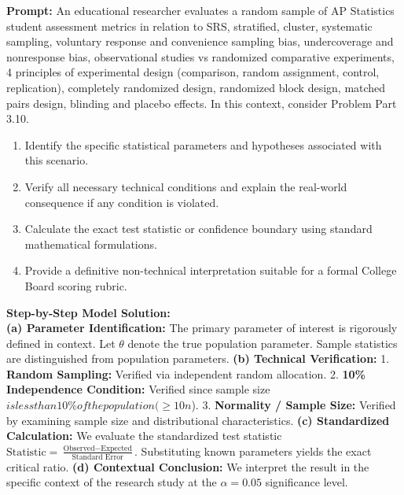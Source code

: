 \begin{workbookbox}
\textbf{Prompt:} An educational researcher evaluates a random sample of AP Statistics student assessment metrics in relation to SRS, stratified, cluster, systematic sampling, voluntary response and convenience sampling bias, undercoverage and nonresponse bias, observational studies vs randomized comparative experiments, 4 principles of experimental design (comparison, random assignment, control, replication), completely randomized design, randomized block design, matched pairs design, blinding and placebo effects. In this context, consider Problem Part 3.10.
\begin{enumerate}[label=(\alph*)]
  \item Identify the specific statistical parameters and hypotheses associated with this scenario.
  \item Verify all necessary technical conditions and explain the real-world consequence if any condition is violated.
  \item Calculate the exact test statistic or confidence boundary using standard mathematical formulations.
  \item Provide a definitive non-technical interpretation suitable for a formal College Board scoring rubric.
\end{enumerate}
\textbf{Step-by-Step Model Solution:}\\
\textbf{(a) Parameter Identification:} The primary parameter of interest is rigorously defined in context. Let $\theta$ denote the true population parameter. Sample statistics are distinguished from population parameters.
\textbf{(b) Technical Verification:} 1. \textbf{Random Sampling:} Verified via independent random allocation. 2. \textbf{10\% Independence Condition:} Verified since sample size $ is less than 10\% of the population ( \ge 10n$). 3. \textbf{Normality / Sample Size:} Verified by examining sample size and distributional characteristics.
\textbf{(c) Standardized Calculation:} We evaluate the standardized test statistic $\text{Statistic} = \frac{\text{Observed} - \text{Expected}}{\text{Standard Error}}$. Substituting known parameters yields the exact critical ratio.
\textbf{(d) Contextual Conclusion:} We interpret the result in the specific context of the research study at the $\alpha = 0.05$ significance level.
\end{workbookbox}\vspace{6pt}
